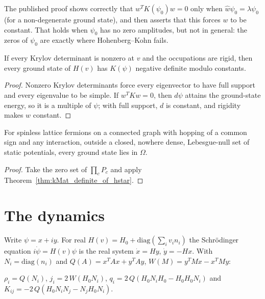 The published proof shows correctly that $w^TK(\psi_0)w=0$ only when $\hat w\psi_0=\lambda\psi_0$ (for a
non-degenerate ground state), and then asserts that this forces $w$ to be constant. That holds when
$\psi_0$ has no zero amplitudes, but not in general: the zeros of $\psi_0$ are exactly where Hohenberg--Kohn
fails.

\begin{theorem}
  \label{thm:kMat_definite_of_hstar}
  \leanok
  If every Krylov determinant is nonzero at $v$ and the occupations are rigid, then every ground state of
  $H(v)$ has $K(\psi)$ negative definite modulo constants.
\end{theorem}
\begin{proof}
  \leanok
  Nonzero Krylov determinants force every eigenvector to have full support and every eigenvalue to be simple.
  If $w^TKw=0$, then $d\psi$ attains the ground-state energy, so it is a multiple of $\psi$; with full support,
  $d$ is constant, and rigidity makes $w$ constant.
\end{proof}

\begin{theorem}
  \label{thm:generic_td_vrep}
  \leanok
  For spinless lattice fermions on a connected graph with hopping of a common sign and any interaction,
  outside a closed, nowhere dense, Lebesgue-null set of static potentials, every ground state lies in
  $\Omega$.
\end{theorem}
\begin{proof}
  \leanok
  Take the zero set of $\prod_cP_c$ and apply Theorem~\ref{thm:kMat_definite_of_hstar}.
\end{proof}

\section{The dynamics}

Write $\psi=x+iy$. For real $H(v)=H_0+\mathrm{diag}(\sum_iv_in_i)$ the Schr\"odinger equation
$i\dot\psi=H(v)\psi$ is the real system $\dot x=Hy$, $\dot y=-Hx$. With $N_i=\mathrm{diag}(n_i)$ and
$Q(A)=x^TAx+y^TAy$, $W(M)=y^TMx-x^TMy$:

\begin{definition}
  \label{def:schr}
  \leanok
  $\rho_i=Q(N_i)$, $j_i=2\,W(H_0N_i)$, $q_i=2\,Q(H_0N_iH_0-H_0H_0N_i)$ and
  $K_{ij}=-2\,Q(H_0N_iN_j-N_jH_0N_i)$.
\end{definition}


